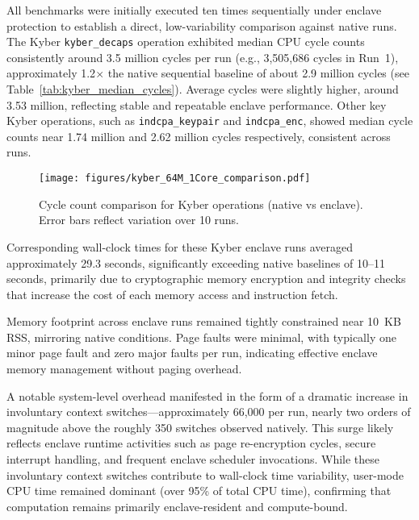 All benchmarks were initially executed ten times sequentially under enclave protection to establish a direct, low-variability comparison against native runs. The Kyber \texttt{kyber\_decaps} operation exhibited median CPU cycle counts consistently around 3.5 million cycles per run (e.g., 3,505,686 cycles in Run~1), approximately 1.2$\times$ the native sequential baseline of about 2.9 million cycles (see Table~\ref{tab:kyber_median_cycles}). Average cycles were slightly higher, around 3.53 million, reflecting stable and repeatable enclave performance. Other key Kyber operations, such as \texttt{indcpa\_keypair} and \texttt{indcpa\_enc}, showed median cycle counts near 1.74 million and 2.62 million cycles respectively, consistent across runs.

\begin{figure}[h]
    \centering
    \texttt{[image: figures/kyber\_64M\_1Core\_comparison.pdf]}
    \caption{Cycle count comparison for Kyber operations (native vs enclave). Error bars reflect variation over 10 runs.}
    \label{fig:kyber_cycles}
\end{figure}

Corresponding wall-clock times for these Kyber enclave runs averaged approximately 29.3 seconds, significantly exceeding native baselines of 10--11 seconds, primarily due to cryptographic memory encryption and integrity checks that increase the cost of each memory access and instruction fetch.


Memory footprint across enclave runs remained tightly constrained near 10~KB RSS, mirroring native conditions. Page faults were minimal, with typically one minor page fault and zero major faults per run, indicating effective enclave memory management without paging overhead.

A notable system-level overhead manifested in the form of a dramatic increase in involuntary context switches—approximately 66,000 per run, nearly two orders of magnitude above the roughly 350 switches observed natively. This surge likely reflects enclave runtime activities such as page re-encryption cycles, secure interrupt handling, and frequent enclave scheduler invocations. While these involuntary context switches contribute to wall-clock time variability, user-mode CPU time remained dominant (over 95\% of total CPU time), confirming that computation remains primarily enclave-resident and compute-bound.

